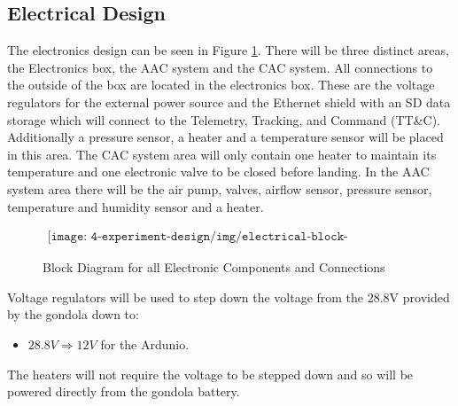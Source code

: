 \pagebreak
\subsection{Electrical Design}

\begin{centering}
The electronics design can be seen in Figure \ref{fig:electronics-block-diagram}. There will be three distinct areas, the Electronics box, the AAC system and the CAC system. All connections to the outside of the box are located in the electronics box. These are the voltage regulators for the external power source and the Ethernet shield with an SD data storage which will connect to the Telemetry, Tracking, and Command (TT\&C). Additionally a pressure sensor, a heater and a temperature sensor will be placed in this area. The CAC system area will only contain one heater to maintain its temperature and one electronic valve to be closed before landing. In the AAC system area there will be the air pump, valves, airflow sensor, pressure sensor, temperature and humidity sensor and a heater.
\end{centering}
\bigskip

\begin{figure}[H]
    \begin{align*}
        \texttt{[image: 4-experiment-design/img/electrical-block-diagram.png]}
    \end{align*}
    \caption{Block Diagram for all Electronic Components and Connections}\label{fig:electronics-block-diagram}
\end{figure}

\begin{centering}
Voltage regulators will be used to step down the voltage from the 28.8V provided by the gondola down to: 
\end{centering}

\begin{centering}
\begin{itemize}
  \item $28.8V \Longrightarrow 12V$ for the Ardunio.  
  \end{itemize}

\end{centering}
\bigskip

\begin{centering}
The heaters will not require the voltage to be stepped down and so will be powered directly from the gondola battery.
\end{centering}
\bigskip


\raggedbottom